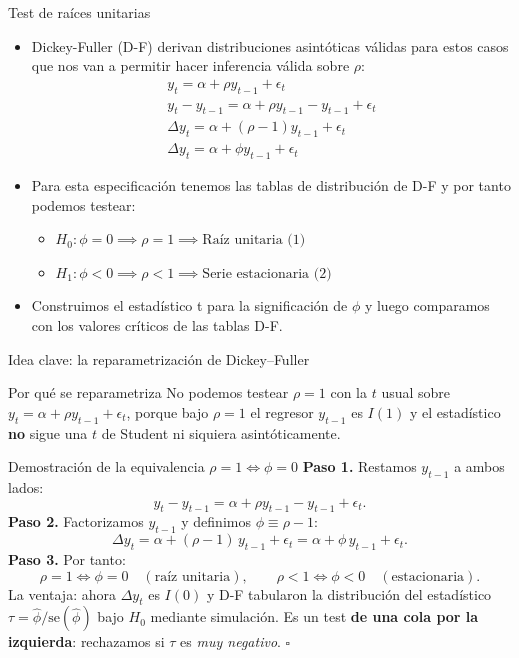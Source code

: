 \documentclass{beamer}
\begin{document}
\begin{frame}{Test de raíces unitarias}
    \begin{itemize}
        \item Dickey-Fuller (D-F) derivan distribuciones asintóticas válidas para estos casos que nos van a permitir hacer inferencia válida sobre $\rho$:
        \begin{eqnarray}
 y_t = \alpha + \rho y_{t-1} + \epsilon_t\\
 y_t - y_{t-1} = \alpha + \rho y_{t-1} - y_{t-1} + \epsilon_t\\
  \Delta y_t = \alpha + (\rho - 1) y_{t-1} + \epsilon_t\\
   \Delta y_t = \alpha + \phi y_{t-1} + \epsilon_t
        \end{eqnarray}

   
        \item Para esta especificación tenemos las tablas de distribución de D-F y por tanto podemos testear:
        \begin{itemize}
            \item $H_0: \phi = 0 \implies \rho = 1 \implies \text{Raíz unitaria (1)}$
            \item $H_1: \phi < 0 \implies \rho < 1 \implies \text{Serie estacionaria (2)}$
        \end{itemize}
        \item Construimos el estadístico t para la significación de $\phi$ y luego comparamos con los valores críticos de las tablas D-F.
    \end{itemize}
\end{frame}

\begin{frame}{Idea clave: la reparametrización de Dickey--Fuller}

\begin{alertblock}{Por qué se reparametriza}
No podemos testear $\rho=1$ con la $t$ usual sobre $y_t=\alpha+\rho y_{t-1}+\epsilon_t$, porque bajo $\rho=1$ el regresor $y_{t-1}$ es $I(1)$ y el estadístico \textbf{no} sigue una $t$ de Student ni siquiera asintóticamente.
\end{alertblock}

\begin{exampleblock}{Demostración de la equivalencia $\rho=1 \Leftrightarrow \phi=0$}
\textbf{Paso 1.} Restamos $y_{t-1}$ a ambos lados:
\[
y_t - y_{t-1} = \alpha + \rho y_{t-1} - y_{t-1} + \epsilon_t.
\]
\textbf{Paso 2.} Factorizamos $y_{t-1}$ y definimos $\phi \equiv \rho-1$:
\[
\Delta y_t = \alpha + (\rho-1)\,y_{t-1} + \epsilon_t = \alpha + \phi\, y_{t-1} + \epsilon_t.
\]
\textbf{Paso 3.} Por tanto:
\[
\rho=1 \iff \phi=0 \quad(\text{raíz unitaria}), \qquad \rho<1 \iff \phi<0 \quad(\text{estacionaria}).
\]
La ventaja: ahora $\Delta y_t$ es $I(0)$ y D-F tabularon la distribución del estadístico $\tau=\hat\phi/\widehat{\text{se}}(\hat\phi)$ bajo $H_0$ mediante simulación. Es un test \textbf{de una cola por la izquierda}: rechazamos si $\tau$ es \emph{muy negativo}. \hfill $\square$
\end{exampleblock}

\end{frame}
\end{document}
